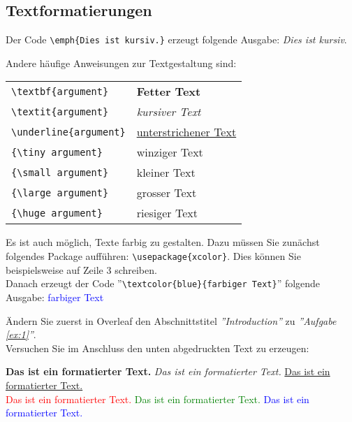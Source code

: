 \newpage
\subsection{Textformatierungen}
Der Code \verb|\emph{Dies ist kursiv.}| erzeugt folgende Ausgabe: \emph{Dies ist kursiv}.

\vspace{2mm}
\noindent Andere häufige Anweisungen zur Textgestaltung sind:

\vspace{4mm}
\begin{tabular}{ll}
\verb|\textbf{argument}| & \textbf{Fetter Text} \\
\verb|\textit{argument}| &  \textit{kursiver Text} \\
\verb|\underline{argument}| &  \underline{unterstrichener Text} \\
\verb|{\tiny argument}| & \tiny{winziger Text} \\
\verb|{\small argument}| & {\small kleiner Text} \\ 
\verb|{\large argument}| & {\large grosser Text} \\
\verb|{\huge argument}| & {\huge riesiger Text}
\end{tabular}

\vspace{4mm}
\noindent Es ist auch möglich, Texte farbig zu gestalten. Dazu müssen Sie zunächst folgendes Package aufführen: \verb|\usepackage{xcolor}|. Dies können Sie beispielsweise auf Zeile 3 schreiben.\\
 Danach erzeugt der Code ''\verb|\textcolor{blue}{farbiger Text}|''  folgende Ausgabe: \textcolor{blue}{farbiger Text}

\vspace{4mm}
\begin{ex} \label{ex:1}
Ändern Sie zuerst in Overleaf den Abschnittstitel \emph{''Introduction''} zu \emph{''Aufgabe \ref{ex:1}''}.\\
Versuchen Sie im Anschluss den unten abgedruckten Text zu erzeugen:
\end{ex}

\vspace{2mm}
\noindent \textbf{Das ist ein formatierter Text.} \emph{Das ist ein formatierter Text.} \underline{Das ist ein formatierter Text.}\\
\textcolor{red}{Das ist ein formatierter Text.} \textcolor{green}{Das ist ein formatierter Text.} \textcolor{blue}{Das ist ein formatierter Text.}\\

\vspace{1cm}

